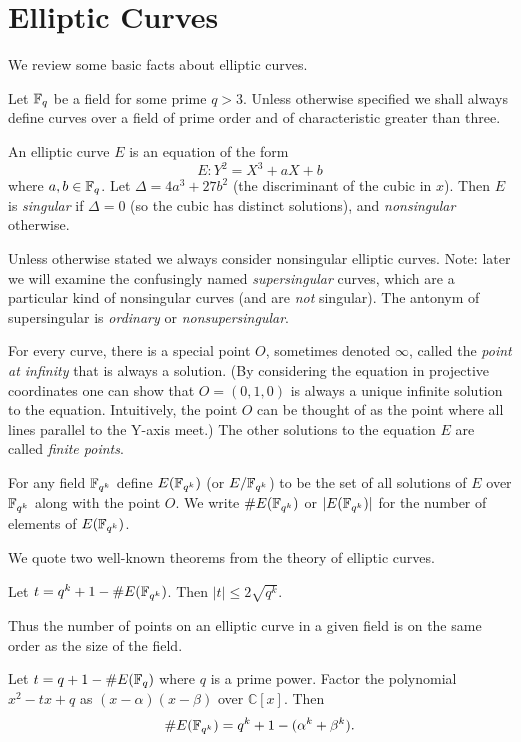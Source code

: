 \chapter {Elliptic Curves}
We review some basic facts about elliptic curves.

Let $\mathbb{F}_q$ be a field for some prime $q > 3$.
Unless otherwise specified we shall always
define curves over a field of prime order and of characteristic greater
than three.

An elliptic curve $E$ is an equation of the form
\[ E: Y^2 = X^3 + a X + b \]
where $a, b \in \mathbb{F}_q$.
Let $\Delta = 4 a^3 + 27b^2$ (the discriminant of the cubic in $x$). Then
$E$ is \emph{singular} if $\Delta = 0$ (so the cubic has distinct solutions),
and \emph{nonsingular} otherwise.

Unless otherwise stated we always consider nonsingular elliptic curves.
Note: later we will examine the confusingly named \emph{supersingular} curves,
which are a particular kind of nonsingular curves (and are \emph{not} singular).
The antonym of supersingular is \emph{ordinary} or \emph{nonsupersingular}.

For every curve, there is a special point $O$, sometimes denoted $\infty$,
called the \emph{point at infinity}
that is always a solution. (By considering the equation in
projective coordinates one can show that $O = (0,1,0)$ is always a unique
infinite solution to the equation. Intuitively,
the point $O$ can be thought of as the point where all lines
parallel to the Y-axis meet.) The other solutions to the equation $E$
are called \emph{finite points}.

For any field $\mathbb{F}_{q^k}$ define $E(\mathbb{F}_{q^k})$ (or $E/\mathbb{F}_{q^k}$)
to be the set of all solutions
of $E$ over $\mathbb{F}_{q^k}$ along with the point $O$. We write $\#E(\mathbb{F}_{q^k})$ 
or $|E(\mathbb{F}_{q^k})|$ for
the number of elements of $E(\mathbb{F}_{q^k})$.

We quote two well-known theorems from the theory of elliptic curves.

\begin{theorem}
[Hasse] Let $t = q^k + 1 - \#E(\mathbb{F}_{q^k})$.
Then $|t| \le 2\sqrt{q^k}$.
\end{theorem}

Thus the number of points on an elliptic curve in a given field
is on the same order as the size of the field.

\begin{theorem}
[Weil] Let $t = q + 1 - \#E(\mathbb{F}_q)$
where $q$ is a prime power.
Factor the polynomial $x^2 - t x + q$ as $(x-\alpha)(x-\beta)$ over
$\mathbb{C}[x]$.
Then
\[ \#E(\mathbb{F}_{q^k}) = q^k + 1 - (\alpha^k + \beta^k) .\]
\end{theorem}

